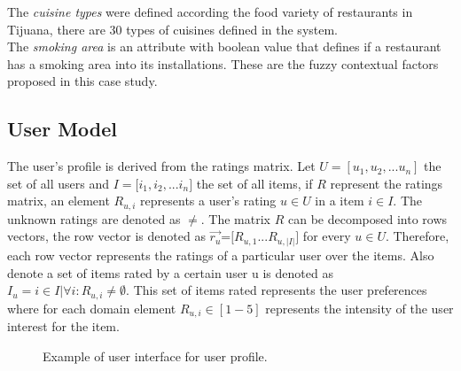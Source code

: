 The \textit{cuisine types} were defined according the food variety 
of restaurants in Tijuana, there are 30 types of cuisines defined 
in the system. \\
The \textit{smoking area} is an attribute with boolean value that 
defines if a restaurant has a smoking area into its installations.
These are the fuzzy contextual factors proposed in this case study.

\subsection{User Model} 

The user's profile is derived from the ratings matrix. Let
$U=[u_1,u_2,...u_n]$ the set of all users and $ I=[i_1,i_2,$...$i_n] $
the set of all items, if $R$ represent the ratings matrix,  an element
$R_{u,i}$ represents a user’s rating $u \in U$  in a item $i \in I$.
The unknown ratings are denoted as $\neq $. The matrix $R$ can be
decomposed into rows vectors, the row vector is denoted as $
\overrightarrow{r_u} $=$[R_{u,1}$...$R_{u,|I|}]$ for every $u \in U$.
Therefore, each row vector represents the ratings of a particular user
over the items. Also denote a set of items rated by a certain user u
is denoted as $ I_u = i \in I | \forall  i: R_{u,i} \neq \emptyset $.
This set of items rated represents the user preferences where for each
domain element $R_{u,i} \in [1-5]$ represents the intensity of the
user interest for  the item.\\

\begin{figure}
\captionsetup{justification=centering,margin=2cm,font=footnotesize}
\centering
\setlength\fboxsep{0pt}
\caption{Example of user interface for user profile.}
\label{fig:user-profile}      
\end{figure}


